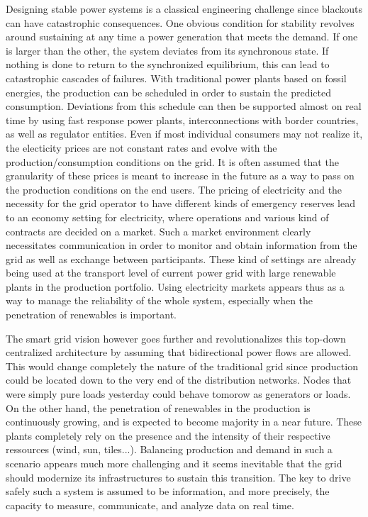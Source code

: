 \documentclass[conference]{IEEEtran}
\begin{document}
Designing stable power systems is a classical engineering challenge since blackouts can have catastrophic consequences. One obvious condition for stability revolves around sustaining at any time a power generation that meets the demand. If one is larger than the other, the system deviates from its synchronous state. If nothing is done to return to the synchronized equilibrium, this can lead to catastrophic cascades of failures. With traditional power plants based on fossil energies, the production can be scheduled in order to sustain the predicted consumption. Deviations from this schedule can then be supported almost on real time by using fast response power plants, interconnections with border countries, as well as regulator entities. Even if most individual consumers may not realize it, the electicity prices are not constant rates and evolve with the production/consumption conditions on the grid. It is often assumed that the granularity of these prices is meant to increase in the future as a way to pass on the production conditions on the end users. The pricing of electricity and the necessity for the grid operator to have different kinds of emergency reserves lead to an economy setting for electricity, where operations and various kind of contracts are decided on a market. Such a market environment clearly necessitates communication in order to monitor and obtain information from the grid as well as exchange between participants. These kind of settings are already being used at the transport level of current power grid with large renewable plants in the production portfolio. Using electricity markets appears thus as a way to manage the reliability of the whole system, especially when the penetration of renewables is important.

The smart grid vision however goes further and revolutionalizes this top-down centralized architecture by assuming that bidirectional power flows are allowed. This would change completely the nature of the traditional grid since production could be located down to the very end of the distribution networks. Nodes that were simply pure loads yesterday could behave tomorow as generators or loads. On the other hand, the penetration of renewables in the production is continuously growing, and is expected to become majority in a near future. These plants completely rely on the presence and the intensity of their respective ressources (wind, sun, tiles...). Balancing production and demand in such a scenario appears much more challenging and it seems inevitable that the grid should modernize its infrastructures to sustain this transition. The key to drive safely such a system is assumed to be information, and more precisely, the capacity to measure, communicate, and analyze data on real time.
\end{document}
